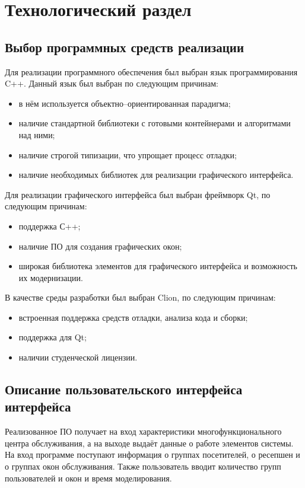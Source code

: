 \chapter{Технологический раздел}

\section{Выбор программных средств реализации}

Для реализации программного обеспечения был выбран язык программирования C++. Данный язык был выбран по следующим причинам:
\begin{itemize}[label=---]
	\item в нём используется объектно--ориентированная парадигма;
	\item наличие стандартной библиотеки с готовыми контейнерами и алгоритмами над ними;
	\item наличие строгой типизации, что упрощает процесс отладки;
	\item наличие необходимых библиотек для реализации графического интерфейса.
\end{itemize}

Для реализации графического интерфейса был выбран фреймворк Qt, по следующим причинам:
\begin{itemize}[label=---]
	\item поддержка С++;
	\item наличие ПО для создания графических окон;
	\item широкая библиотека элементов для графического интерфейса и возможность их модернизации.
\end{itemize}

В качестве среды разработки был выбран Clion, по следующим причинам:
\begin{itemize}[label=---]
	\item встроенная поддержка средств отладки, анализа кода и сборки;
	\item поддержка для Qt;
	\item наличии студенческой лицензии.
\end{itemize}

\section{Описание пользовательского интерфейса интерфейса}

Реализованное ПО получает на вход характеристики многофункционального центра обслуживания, а на выходе выдаёт данные о работе элементов системы. На вход программе поступают информация о группах посетителей, о ресепшен и о группах окон обслуживания. Также пользователь вводит количество групп пользователей и окон и время моделирования.

